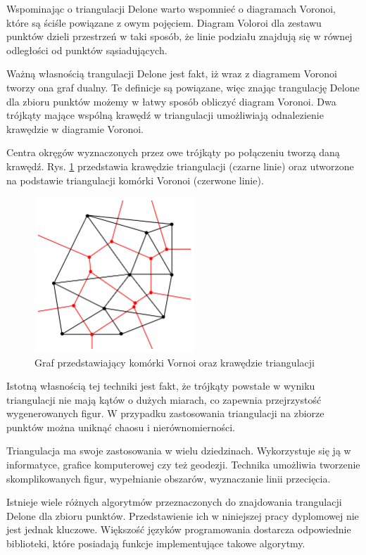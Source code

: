 Wspominając o triangulacji Delone warto wspomnieć o diagramach Voronoi, które są ściśle powiązane z owym pojęciem. Diagram Voloroi dla zestawu punktów dzieli przestrzeń w taki sposób, że linie podziału znajdują się w równej odległości od punktów sąsiadujących.

Ważną własnością trangulacji Delone jest fakt, iż wraz z diagramem Voronoi tworzy ona graf dualny. Te definicje są powiązane, więc znając trangulację Delone dla zbioru punktów możemy w łatwy sposób obliczyć diagram Voronoi. Dwa trójkąty mające wspólną krawędź w triangulacji umożliwiają odnalezienie krawędzie w diagramie Voronoi. 

Centra okręgów wyznaczonych przez owe trójkąty po połączeniu tworzą daną krawędź. Rys. \ref{fig:voronoi}  przedstawia krawędzie triangulacji (czarne linie) oraz utworzone na podstawie triangulacji komórki Voronoi (czerwone linie).

\begin{figure}[h]
	\centering
	\includegraphics[width=6cm]{zdjęcia/voronoi.png}
	\caption{Graf przedstawiający komórki Vornoi oraz krawędzie triangulacji \cite{tDelone}} 
	\label{fig:voronoi}
\end{figure}

Istotną własnością tej techniki jest fakt, że trójkąty powstałe w wyniku triangulacji nie mają kątów o dużych miarach, co zapewnia przejrzystość wygenerowanych figur. W przypadku zastosowania triangulacji na zbiorze punktów można uniknąć chaosu i nierównomierności.

Triangulacja ma swoje zastosowania w wielu dziedzinach. Wykorzystuje się ją w informatyce, grafice komputerowej czy też geodezji. Technika umożliwia tworzenie skomplikowanych figur, wypełnianie obszarów, wyznaczanie linii przecięcia.

Istnieje wiele różnych algorytmów przeznaczonych do znajdowania trangulacji Delone dla zbioru punktów. Przedstawienie ich w niniejszej pracy dyplomowej nie jest jednak kluczowe. Większość języków programowania dostarcza odpowiednie biblioteki, które posiadają funkcje implementujące takowe algorytmy. 


